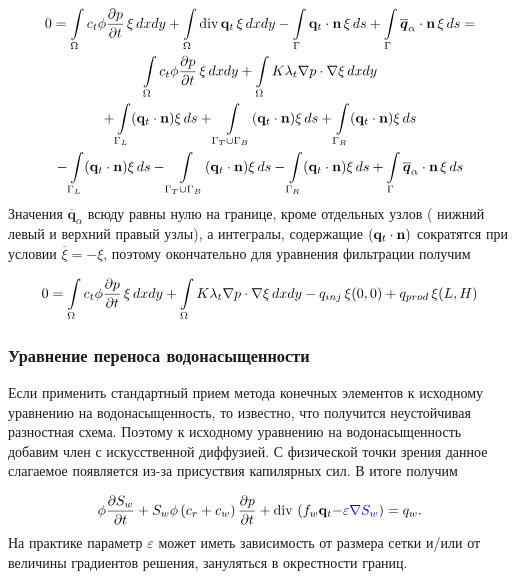 \begin{multline}
	\displaystyle 0=\int\limits_\Omega c_t\phi \dfrac{\partial p}{\partial t}\, \xi \,dx dy 
	 + \int\limits_\Omega \operatorname{div}{\mathbf{q}_t}\, \xi \,dx dy
	 - \int\limits_{\Gamma} \mathbf{q}_t\cdot \mathbf{n} \, \xi \,ds 
	 + \int\limits_{\Gamma} \overline{\bm{q}}_{\alpha}\cdot \mathbf{n} \, \xi \,ds = \\ 
	 \int\limits_\Omega c_t\phi \dfrac{\partial p}{\partial t}\, \xi \,dx dy 
	 + \int\limits_\Omega K \lambda_t \nabla p \cdot \nabla\xi \,dx dy \\
	 +\int\limits_{\Gamma_L} (\mathbf{q}_t \cdot \mathbf{n}) \xi \, ds
	 +\int\limits_{\Gamma_T\cup \Gamma_B} (\mathbf{q}_t \cdot \mathbf{n}) \xi \, ds
	 +\int\limits_{\Gamma_R} (\mathbf{q}_t \cdot \mathbf{n}) \xi \, ds \\
	 -\int\limits_{\Gamma_L} (\mathbf{q}_t \cdot \mathbf{n}) \xi \, ds
	 -\int\limits_{\Gamma_T\cup \Gamma_B} (\mathbf{q}_t \cdot \mathbf{n}) \xi \, ds
	 -\int\limits_{\Gamma_R} (\mathbf{q}_t \cdot \mathbf{n}) \xi \, ds 
	 +\int\limits_{\Gamma} \overline{\bm{q}}_{\alpha}\cdot \mathbf{n} \, \xi \, ds\\ 
\end{multline}
Значения $\overline{\bm{q}}_{\alpha}$ всюду равны нулю на границе, кроме отдельных узлов (
нижний левый и верхний правый узлы), а интегралы, содержащие $(\mathbf{q}_t \cdot \mathbf{n})$ сократятся
при условии $\overline{\xi} = -\xi$, поэтому окончательно для уравнения фильтрации получим

\begin{equation}
	0=\int\limits_\Omega c_t\phi \dfrac{\partial p}{\partial t}\, \xi \,dx dy 
	+ \int\limits_\Omega K \lambda_t \nabla p \cdot \nabla\xi \,dx dy - q_{inj}\, \xi(0,0)
	+ q_{prod}\, \xi(L,H)
\end{equation}

\subsubsection{Уравнение переноса водонасыщенности}

Если применить стандартный прием метода конечных элементов к исходному уравнению на водонасыщенность, то известно, что получится неустойчивая разностная схема. 
Поэтому к исходному уравнению на водонасыщенность добавим член с искусственной диффузией. С физической точки зрения данное слагаемое появляется из-за присуствия капилярных сил. В итоге получим 

\begin{equation}\label{eq:satur_diffusion}
	\phi \dfrac{\partial S_w}{\partial t} + S_w\phi\left(c_r + c_w \right)\dfrac{\partial p}{\partial t} + \operatorname{div}\, \left( f_w \mathbf{q}_t {- \color{blue}\varepsilon \nabla S_w} \right) = 
	q_w.
\end{equation}
На практике параметр $\varepsilon$ может иметь зависимость от размера сетки и/или от величины градиентов решения, зануляться в окрестности границ.


